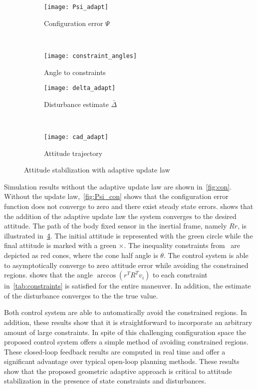 \documentclass[letterpaper, 10 pt, conference]{ieeeconf}  %
\begin{document}
\begin{figure} 
	\centering 
	\begin{subfigure}[htbp]{0.5\columnwidth} 
		\texttt{[image: Psi\_adapt]} 
		\caption{Configuration error \( \Psi \)} \label{fig:Psi_adapt} 
	\end{subfigure}~
	\begin{subfigure}[htbp]{0.5\columnwidth} 
		\texttt{[image: constraint\_angles]} 
		\caption{Angle to constraints} \label{fig:con_angles} 
	\end{subfigure}
	
	\centering
	\begin{subfigure}[htbp]{0.5\columnwidth} 
		\texttt{[image: delta\_adapt]} 
		\caption{Disturbance estimate \( \bar \Delta \)} \label{fig:delta_adapt} 
	\end{subfigure}~
	\begin{subfigure}[htbp]{0.5\columnwidth} 
		\texttt{[image: cad\_adapt]} 
		\caption{Attitude trajectory} \label{fig:cad_adapt} 
	\end{subfigure}
	\caption{Attitude stabilization with adaptive update law}
	\label{fig:adapt} 
\end{figure}

Simulation results without the adaptive update law are shown in~\cref{fig:con}.
Without the update law,~\cref{fig:Psi_con} shows that the configuration error function does not converge to zero and there exist steady state errors.
 shows that the addition of the adaptive update law the system converges to the desired attitude.
The path of the body fixed sensor in the inertial frame, namely \( R r \), is illustrated in~\cref{fig:cad_adapt}.
The initial attitude is represented with the green circle while the final attitude is marked with a green \(\times\).
The inequality constraints from~ are depicted as red cones, where the cone half angle is \( \theta \).
The control system is able to asymptotically converge to zero attitude error while avoiding the constrained regions.
 shows that the angle \( \arccos(r^T R^T v_i) \) to each constraint in~\cref{tab:constraints} is satisfied for the entire maneuver.
In addition, the estimate of the disturbance converges to the the true value.

Both control system are able to automatically avoid the constrained regions. 
In addition, these results show that it is straightforward to incorporate an arbitrary amount of large constraints.
In spite of this challenging configuration space the proposed control system offers a simple method of avoiding constrained regions.
These closed-loop feedback results are computed in real time and offer a significant advantage over typical open-loop planning methods.
These results show that the proposed geometric adaptive approach is critical to attitude stabilization in the presence of state constraints and disturbances.
\end{document}
